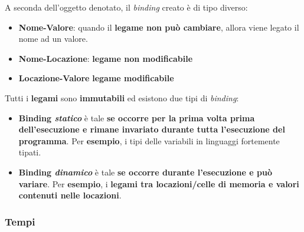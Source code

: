 \documentclass[a4paper]{article}
\begin{document}
	A seconda dell'oggetto denotato, il \emph{binding} creato è di tipo diverso:
	\begin{itemize}
		\item \textbf{Nome-Valore}: quando il \textbf{legame non può cambiare}, allora viene legato il nome ad un valore.
		
		\item \textbf{Nome-Locazione}: \textbf{legame non modificabile}
		
		\item \textbf{Locazione-Valore} \textbf{legame modificabile}
	\end{itemize}
	Tutti i \textbf{legami} sono \textbf{immutabili} ed esistono due tipi di \emph{binding}:
	\begin{itemize}
		\item \textbf{Binding \emph{statico}} è tale \textbf{se occorre per la prima volta prima dell'esecuzione e rimane invariato durante tutta l'esecuzione del programma}.\newline
		Per \textcolor{Green4}{\textbf{esempio}}, i tipi delle variabili in linguaggi fortemente tipati.
		
		\item \textbf{Binding \emph{dinamico}} è tale \textbf{se occorre durante l'esecuzione e può variare}.\newline
		Per \textcolor{Green4}{\textbf{esempio}}, i \textbf{legami tra locazioni/celle di memoria e valori contenuti nelle locazioni}.
	\end{itemize}\newpage
	
	\subsubsection{Tempi}
	
\end{document}
